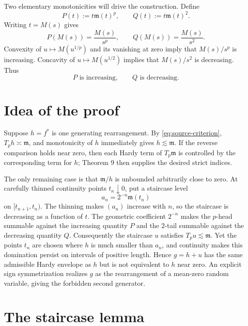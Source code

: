 \documentclass[11pt]{article}
\theoremstyle{definition}
\theoremstyle{remark}
\newcommand{\Tp}{T_p}
\newcommand{\mfun}{\mathfrak m}
\newcommand{\lesssimc}{\mathrel{\lesssim}}
\newcommand{\asympc}{\mathrel{\asymp}}
\begin{document}
Two elementary monotonicities will drive the construction.  Define
\begin{equation}\label{eq:PQ}
  P(t):=t\mfun(t)^p,
  \qquad Q(t):=t\mfun(t)^2.
\end{equation}
Writing $t=M(s)$ gives
\[
  P(M(s))=\frac{M(s)}{s^p},
  \qquad
  Q(M(s))=\frac{M(s)}{s^2}.
\]
Convexity of $u\mapsto M(u^{1/p})$ and its vanishing at zero imply that
$M(s)/s^p$ is increasing.  Concavity of $u\mapsto M(u^{1/2})$ implies that
$M(s)/s^2$ is decreasing.  Thus
\begin{equation}\label{eq:monotonicities}
  P\text{ is increasing},
  \qquad Q\text{ is decreasing}.
\end{equation}

\section{Idea of the proof}

Suppose $h=f^*$ is one generating rearrangement.  By
\eqref{eq:source-criterion}, $\Tp h\asympc\mfun$, and monotonicity of $h$
immediately gives $h\lesssimc\mfun$.  If the reverse comparison holds near
zero, then each Hardy term of $\Tp\mfun$ is controlled by the corresponding
term for $h$; Theorem 9 then supplies the desired strict indices.

The only remaining case is that $\mfun/h$ is unbounded arbitrarily close to
zero.  At carefully thinned continuity points $t_n\downarrow0$, put a
staircase level
\[
  a_n=2^{-n}\mfun(t_n)
\]
on $[t_{n+1},t_n)$.  The thinning makes $(a_n)$ increase with $n$, so the
staircase is decreasing as a function of $t$.  The geometric coefficient
$2^{-n}$ makes the $p$-head summable against the increasing quantity $P$ and
the $2$-tail summable against the decreasing quantity $Q$.  Consequently the
staircase $u$ satisfies $\Tp u\lesssimc\mfun$.  Yet the points $t_n$ are
chosen where $h$ is much smaller than $a_n$, and continuity makes this
domination persist on intervals of positive length.  Hence $g=h+u$ has the
same admissible Hardy envelope as $h$ but is not equivalent to $h$ near zero.
An explicit sign symmetrization realizes $g$ as the rearrangement of a
mean-zero random variable, giving the forbidden second generator.

\section{The staircase lemma}
\end{document}

